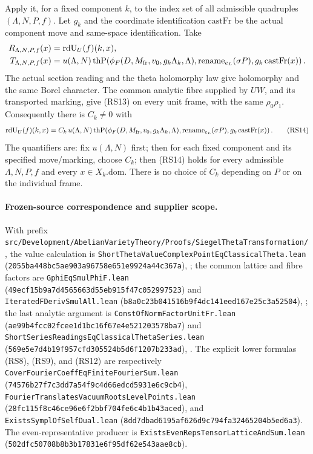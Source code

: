 Apply it, for a fixed component \(k\), to the index
set of all admissible quadruples
\((\Lambda,N,P,f)\).
Let \(g_k\) and the coordinate identification
\(\mathrm{castFr}\) be the actual component move
and same-space identification.
Take
\[
 \begin{split}
 R_{\Lambda,N,P,f}(x)&=\mathrm{rdU}_U(f)(k,x),\\
 T_{\Lambda,N,P,f}(x)&=u(\Lambda,N)\,
    \mathrm{thP}\!\left(\phi_F(D,M_{\rm fr},v_0,
                           g_k\Lambda_k,\Lambda),
       \mathrm{rename}_{e_L}(\sigma P),
                    g_k\,\mathrm{castFr}(x)\right).
 \end{split}
\]
The actual section reading and the theta holomorphy
law give holomorphy and the same Borel character.
The common analytic fibre supplied by \(UW\), and
its transported marking, give (RS13) on every unit
frame, with the same \(\rho_0\rho_1\).
Consequently there is \(C_k\ne0\) with
\[
  \mathrm{rdU}_U(f)(k,x)=C_k\,u(\Lambda,N)\,
    \mathrm{thP}\!\left(\phi_F(D,M_{\rm fr},v_0,
                           g_k\Lambda_k,\Lambda),
       \mathrm{rename}_{e_L}(\sigma P),
                    g_k\,\mathrm{castFr}(x)\right).
 \tag{RS14}\label{eq:sr-source-short-reading-global-scalar}
\]
The quantifiers are: fix \(u(\Lambda,N)\) first;
then for each fixed component and its specified
move/marking, choose \(C_k\); then (RS14) holds for
every admissible \(\Lambda,N,P,f\) and every
\(x\in X_k.\mathrm{dom}\).
There is no choice of \(C_k\) depending on \(P\)
or on the individual frame.

\paragraph{Frozen-source correspondence and supplier scope.}
With prefix
\texttt{src/Development/AbelianVarietyTheory/Proofs/SiegelThetaTransformation/},
the value calculation is
\texttt{ShortThetaValueComplexPointEqClassicalTheta.lean}
(\texttt{2055ba448bc5ae903a96758e651e9924a44c367a}),
;
the common lattice and fibre factors are
\texttt{GphiEqSmulPhiF.lean}
(\texttt{49ecf15b9a7d4565663d55eb915f47c052997523})
and \texttt{IteratedFDerivSmulAll.lean}
(\texttt{b8a0c23b041516b9f4dc141eed167e25c3a52504}),
;
the last analytic argument is
\texttt{ConstOfNormFactorUnitFr.lean}
(\texttt{ae99b4fcc02fcee1d1bc16f67e4e521203578ba7})
and \texttt{ShortSeriesReadingsEqClassicalThetaSeries.lean}
(\texttt{569e5e7d4b19f957cfd305524b5d6f1207b233ad}),
.
The explicit lower formulas (RS8), (RS9), and (RS12) are
respectively
\texttt{CoverFourierCoeffEqFiniteFourierSum.lean}
(\texttt{74576b27f7c3dd7a54f9c4d66edcd5931e6c9cb4}),
\texttt{FourierTranslatesVacuumRootsLevelPoints.lean}
(\texttt{28fc115f8c46ce96e6f2bbf704fe6c4b1b43aced}),
and \texttt{ExistsSymplOfSelfDual.lean}
(\texttt{8dd7dbad6195af626d9c794fa32465204b5ed6a3}).
The even-representative producer is
\texttt{ExistsEvenRepsTensorLatticeAndSum.lean}
(\texttt{502dfc50708b8b3b17831e6f95df62e543aae8cb}).


